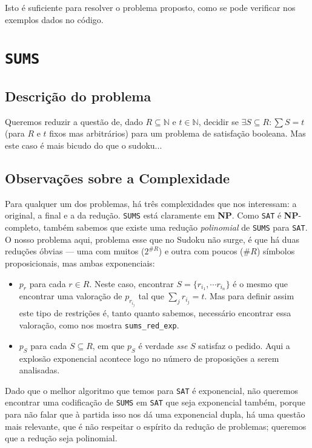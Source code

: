 \documentclass[a4paper,12pt]{article}
\theoremstyle{definition}
\theoremstyle{theorem}
\theoremstyle{remark}
\newcommand{\sums}{\texttt{SUMS}\xspace}
\newcommand{\sat}{\texttt{SAT}\xspace}
\newcommand{\np}{\textbf{NP}\xspace}
\newcommand{\code}[1]{\texttt{#1}}
\begin{document}
Isto é suficiente para resolver o problema proposto, como se pode verificar nos
exemplos dados no código.

\section{\sums}
\subsection{Descrição do problema}
Queremos reduzir a questão de, dado $R\subseteq\mathbb N$ e $t\in\mathbb N$,
decidir se $\exists S\subseteq R : \sum S = t$
(para $R$ e $t$ fixos mas arbitrários) para um problema de satisfação booleana.
Mas este caso
é mais bicudo do
que o sudoku...

\subsection{Observações sobre a Complexidade}
Para qualquer um dos problemas, há três complexidades que nos interessam: a
original, a final e a da redução. 
\sums está claramente em \np. Como \sat é \np-completo, também sabemos que
existe uma redução \emph{polinomial} de \sums para \sat.
O nosso problema aqui, problema esse que
no Sudoku não surge, é que há duas reduções
óbvias \---- uma com muitos ($2^{\#R}$) e outra com poucos ($\#R$) símbolos
proposicionais, mas ambas
exponenciais:
\begin{itemize}
   \item $p_r$ para cada $r\in R$. Neste caso, encontrar
      $S=\{r_{i_1},\cdots r_{i_n}\}$ é o mesmo que encontrar uma valoração
      de $p_{r_{i_j}}$ tal que $\sum_j r_{i_j}=t$.
      Mas para definir assim este tipo de restrições é, tanto quanto sabemos,
      necessário
      encontrar essa valoração, como nos mostra \code{sums\_red\_exp}.

   \item $p_S$ para cada $S\subseteq R$, em que $p_S$ 
      é verdade \emph{sse} $S$ satisfaz o pedido.
      Aqui a explosão exponencial acontece logo no número de proposições a
      serem analisadas.
\end{itemize}

Dado que o melhor algoritmo que temos para \sat é exponencial, não queremos
encontrar uma codificação de \sums em \sat que seja exponencial também, porque
para não falar que à partida isso nos dá uma exponencial dupla, há uma
questão mais relevante, que é não respeitar o espírito da redução de problemas;
queremos que a redução seja polinomial.
\end{document}
